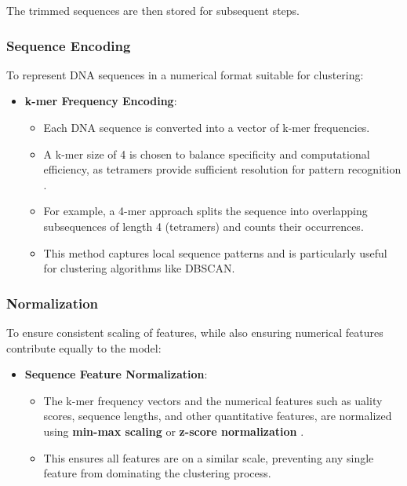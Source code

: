 The trimmed sequences are then stored for subsequent steps.

\subsubsection{Sequence Encoding}
To represent DNA sequences in a numerical format suitable for clustering:
\begin{itemize}
    \item \textbf{k-mer Frequency Encoding}:
    \begin{itemize}
        \item Each DNA sequence is converted into a vector of k-mer frequencies.
        \item A k-mer size of 4 is chosen to balance specificity and computational efficiency, as tetramers provide sufficient resolution for pattern recognition \cite{kmer_size_choice}.
        \item For example, a 4-mer approach splits the sequence into overlapping subsequences of length 4 (tetramers) and counts their occurrences.
        \item This method captures local sequence patterns and is particularly useful for clustering algorithms like DBSCAN.
    \end{itemize}
\end{itemize}

\subsubsection{Normalization}
To ensure consistent scaling of features, while also ensuring numerical features contribute equally to the model:
\begin{itemize}
    \item \textbf{Sequence Feature Normalization}:
    \begin{itemize}
        \item The k-mer frequency vectors and the numerical features such as uality scores, sequence lengths, and other quantitative features, are normalized using \textbf{min-max scaling} or \textbf{z-score normalization} \cite{normalization_methods}.
        \item This ensures all features are on a similar scale, preventing any single feature from dominating the clustering process.
    \end{itemize}
\end{itemize}

